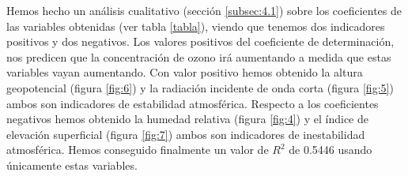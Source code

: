 \documentclass[12pt]{article}
\begin{document}
 Hemos hecho un análisis cualitativo (sección \ref{subsec:4.1}) sobre los coeficientes de las variables obtenidas (ver tabla \ref{tabla}), viendo que tenemos dos indicadores positivos y dos negativos. Los valores positivos del coeficiente de determinación, nos predicen que la concentración de ozono irá aumentando a medida que estas variables vayan aumentando. Con valor positivo hemos obtenido la altura geopotencial (figura \ref{fig:6}) y la radiación incidente de onda corta (figura \ref{fig:5}) ambos son indicadores de estabilidad atmosférica. Respecto a los coeficientes negativos hemos obtenido la humedad relativa (figura \ref{fig:4}) y el índice de elevación superficial (figura \ref{fig:7}) ambos son indicadores de inestabilidad atmosférica. Hemos conseguido finalmente un valor de $R^2$ de 0.5446 usando únicamente estas variables.







\end{document}

